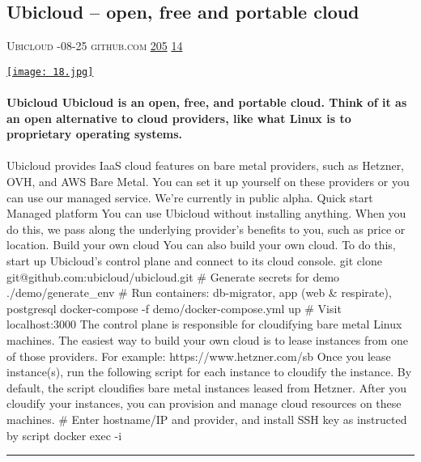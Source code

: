 \documentclass[10pt,a4paper]{article}
\begin{document}
\begin{multicols}{2}
\begin{minipage}{\linewidth}
\subsection{Ubicloud – open, free and portable cloud}
\textsc{\footnotesize
{\scriptsize\faUser}\space 
Ubicloud 
{\scriptsize\faCalendar}-08-25 
{\scriptsize\faGithub}\space 
github.com 
{\scriptsize\faThumbsOUp}\space 
\href{http://news.ycombinator.com/item?id=37154138\&utm\_term=comment}{205} 
{\scriptsize\faComments}\space 
\href{http://news.ycombinator.com/item?id=37154138\&utm\_term=comment}{14} 
}
\par\medskip\noindent
\href{https://github.com/ubicloud/ubicloud?utm\_source=hackernewsletter\&utm\_medium=email\&utm\_term=show\_hn}{
    \texttt{[image: 18.jpg]}
}
\end{minipage}
\paragraph{}
\textbf{Ubicloud
Ubicloud is an open, free, and portable cloud. Think of it as an open alternative to cloud providers, like what Linux is to proprietary operating systems.}
\paragraph{}

Ubicloud provides IaaS cloud features on bare metal providers, such as Hetzner, OVH, and AWS Bare Metal. You can set it up yourself on these providers or you can use our managed service. We're currently in public alpha.
Quick start
Managed platform
You can use Ubicloud without installing anything. When you do this, we pass along the underlying provider's benefits to you, such as price or location.
Build your own cloud
You can also build your own cloud. To do this, start up Ubicloud's control plane and connect to its cloud console.
git clone git@github.com:ubicloud/ubicloud.git \# Generate secrets for demo ./demo/generate\_env \# Run containers: db-migrator, app (web \& respirate), postgresql docker-compose -f demo/docker-compose.yml up \# Visit localhost:3000
The control plane is responsible for cloudifying bare metal Linux machines. The easiest way to build your own cloud is to lease instances from one of those providers. For example: https://www.hetzner.com/sb
Once you lease instance(s), run the following script for each instance to cloudify the instance. By default, the script cloudifies bare metal instances leased from Hetzner. After you cloudify your instances, you can provision and manage cloud resources on these machines.
\# Enter hostname/IP and provider, and install SSH key as instructed by script docker exec -i
\par\noindent\textcolor{red}{\rule{\linewidth}{0.2mm}}
\vfill
\null
\noindent\begin{minipage}{\linewidth}

\end{minipage}
\end{multicols}
\end{document}
